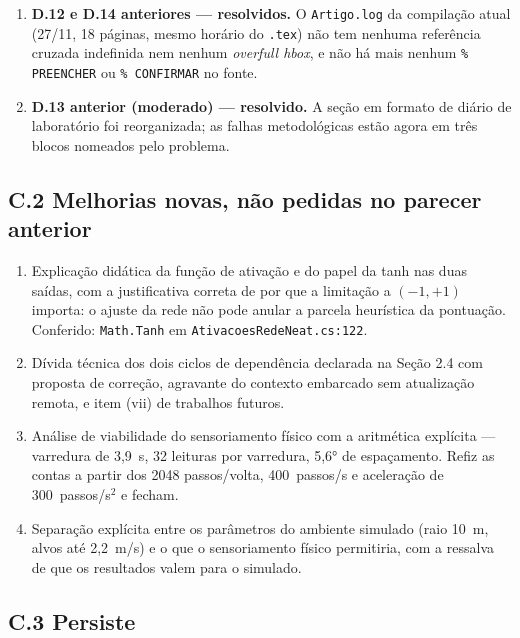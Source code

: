 \documentclass[11pt,a4paper]{article}
\begin{document}
\begin{enumerate}
  \item \textbf{D.12 e D.14 anteriores --- resolvidos.} O \texttt{Artigo.log} da compilação atual
  (27/11, 18 páginas, mesmo horário do \texttt{.tex}) não tem nenhuma referência cruzada indefinida
  nem nenhum \textit{overfull hbox}, e não há mais nenhum \texttt{\% PREENCHER} ou
  \texttt{\% CONFIRMAR} no fonte.

  \item \textbf{D.13 anterior (moderado) --- resolvido.} A seção em formato de diário de laboratório
  foi reorganizada; as falhas metodológicas estão agora em três blocos nomeados pelo problema.
\end{enumerate}

\subsection*{C.2 Melhorias novas, não pedidas no parecer anterior}

\begin{enumerate}
  \item Explicação didática da função de ativação e do papel da tanh nas duas saídas, com a
  justificativa correta de por que a limitação a $(-1,+1)$ importa: o ajuste da rede não pode anular
  a parcela heurística da pontuação. Conferido: \texttt{Math.Tanh} em
  \texttt{AtivacoesRedeNeat.cs:122}.
  \item Dívida técnica dos dois ciclos de dependência declarada na Seção 2.4 com proposta de
  correção, agravante do contexto embarcado sem atualização remota, e item (vii) de trabalhos
  futuros.
  \item Análise de viabilidade do sensoriamento físico com a aritmética explícita --- varredura de
  3,9~s, 32 leituras por varredura, 5,6° de espaçamento. Refiz as contas a partir dos 2048
  passos/volta, 400~passos/s e aceleração de 300~passos/s$^2$ e fecham.
  \item Separação explícita entre os parâmetros do ambiente simulado (raio 10~m, alvos até 2,2~m/s) e
  o que o sensoriamento físico permitiria, com a ressalva de que os resultados valem para o simulado.
\end{enumerate}

\subsection*{C.3 Persiste}
\end{document}
